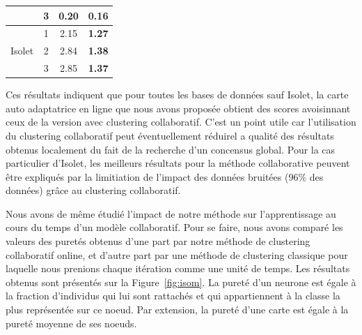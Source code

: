 \documentclass[a4paper]{article}
\begin{document}
\begin{table}[!h]
\begin{center}
\begin{tabular}{cccc}
                           & 3    & 0.20            & \textbf{0.16}                                                                  \\ \midrule
\multirow{3}{*}{Isolet}    & 1    & 2.15            & \textbf{1.27}                                                                  \\
                           & 2    & 2.84            & \textbf{1.38}                                                                  \\
                           & 3    & 2.85            & \textbf{1.37}                                                                 \\ \midrule
\end{tabular}
		\end{center}
\label{tab:tab1}
	\end{table}

    Ces résultats indiquent que pour toutes les bases de données sauf Isolet, la carte auto adaptatrice en ligne que nous avons proposée obtient des scores avoisinnant ceux de la version avec clustering collaboratif. C'est un point utile car l'utilisation du clustering collaboratif peut éventuellement réduirel a qualité des résultats obtenus localement du fait de la recherche d'un concensus global. Pour la cas particulier d'Isolet, les meilleurs résultats pour la méthode collaborative peuvent \^{e}tre expliqués par la limitiation de l'impact des données bruitées (96\% des données) grâce au clustering collaboratif.

    Nous avons de m\^{e}me étudié l'impact de notre méthode sur l'apprentissage au cours du temps d'un modèle collaboratif. Pour se faire, nous avons comparé les valeurs des puretés obtenus d'une part par notre méthode de clustering collaboratif online, et d'autre part par une méthode de clustering classique pour laquelle nous prenions chaque itération comme une unité de temps. Les résultats obtenus sont présentés sur la Figure~\ref{fig:isom}. La pureté d'un neurone est égale à la fraction d'individus qui lui sont rattachés et qui appartiennent à la classe la plus représentée sur ce noeud. Par extension, la pureté d'une carte est égale à la pureté moyenne de ses noeuds.
\end{document}
